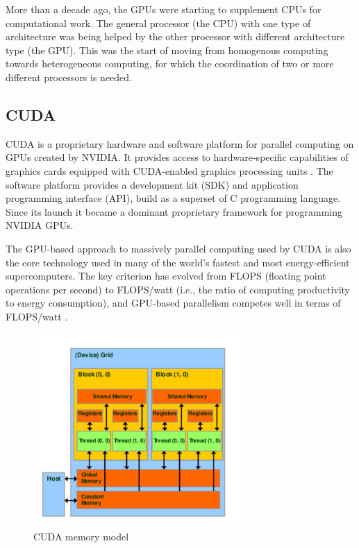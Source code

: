 More than a decade ago, the GPUs were starting to supplement CPUs for computational work. The general processor (the CPU) with one type of architecture was being helped by the other processor with different architecture type (the GPU). This was the start of moving from homogenous computing towards heterogeneous computing, for which the coordination of two or more different processors is needed. 

\subsection{CUDA}
CUDA is a proprietary hardware and software platform for parallel computing on GPUs created by NVIDIA. It provides access to hardware-specific capabilities of graphics cards equipped with CUDA-enabled graphics processing units \cite{stortiCUDAEngineersIntroduction2016}. The software platform provides a development kit (SDK) and application programming interface (API), build as a superset of C programming language. Since its launch it became a dominant proprietary framework for programming NVIDIA GPUs.

The GPU-based approach to massively parallel computing used by CUDA is also the core technology used in many of the world’s fastest and most energy-efficient supercomputers. The key criterion has evolved from FLOPS (floating point operations per second) to FLOPS/watt (i.e., the ratio of computing productivity to energy consumption), and GPU-based parallelism competes well in terms of FLOPS/watt \citep{stortiCUDAEngineersIntroduction2016}.

\begin{figure}[!ht]
	\centering
	\includegraphics[width=0.7\textwidth]{figures/cuda-device-memory.jpg}
	\caption{CUDA memory model}
	\label{fig:cuda-memory-model}
\end{figure}

